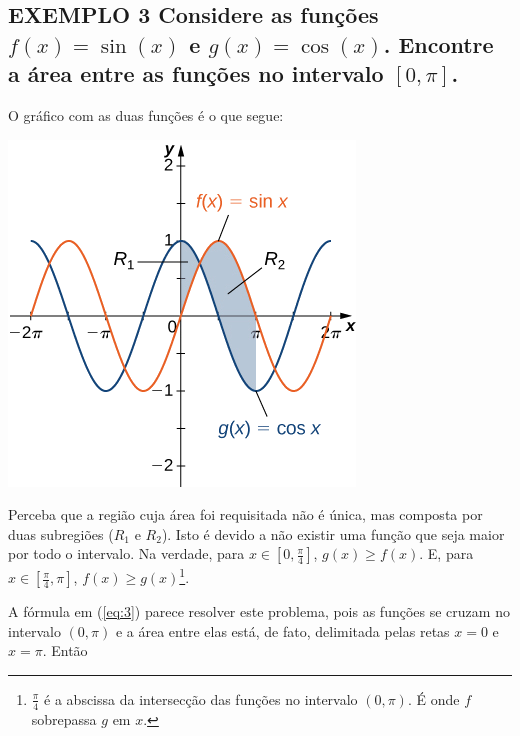 \documentclass[a4paper, 12pt]{extreport}
\begin{document}
    \subsection*{\small {\color{astral}EXEMPLO 3} \textmd{
      Considere as funções $f(x) = \sin(x)$ e $g(x) = \cos(x)$. Encontre a área entre as funções no intervalo $[0, \pi]$.
    }}
      O gráfico com as duas funções é o que segue:
      \begin{center}
        \includegraphics{eg3}
      \end{center}
      \justifying
      Perceba que a região cuja área foi requisitada não é única, mas composta por duas subregiões ($R_1$ e $R_2$). Isto é devido
      a não existir uma função que seja maior por todo o intervalo. Na verdade, para $x\in[0, \frac{\pi}{4}]$, $g(x) \geqslant f(x)$. E, para
      $x\in[\frac{\pi}{4}, \pi]$, $f(x) \geqslant g(x)$\footnote{
        $\frac{\pi}{4}$ é a abscissa da intersecção das funções no intervalo $(0, \pi)$.
        É onde $f$ sobrepassa $g$ em $x$.
      }.

      A fórmula em (\ref{eq:3}) parece resolver este problema, pois as funções se cruzam no intervalo $(0, \pi)$ e a área entre elas está, de fato,
      delimitada pelas retas $x = 0$ e $x = \pi$. Então
\end{document}
